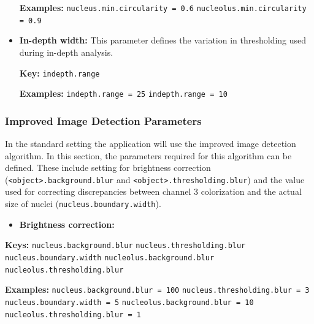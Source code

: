 \documentclass[a4paper, 12pt]{article}
\newcommand{\code}[1]{\colorbox{codegray}{\texttt{#1}}}
\begin{document}
\begin{itemize}
  \textbf{Examples:}
  \newline \code{nucleus.min.circularity = 0.6}
  \newline \code{nucleolus.min.circularity = 0.9}
  
  \item \textbf{In-depth width:} This parameter defines the variation in
  thresholding used during in-depth analysis.
  
  \textbf{Key:}
  \newline \code{indepth.range}
  
  \textbf{Examples:}
  \newline \code{indepth.range = 25}
  \newline \code{indepth.range = 10}
  
\end{itemize}

\subsubsection{Improved Image Detection Parameters}
In the standard setting the application will use the improved image detection
algorithm. In this section, the parameters required for this algorithm can be
defined. These include setting for brightness correction
(\code{<object>.background.blur} and \code{<object>.thresholding.blur}) and the
value used for correcting discrepancies between channel 3 colorization and the
actual size of nuclei (\code{nucleus.boundary.width}).

\begin{itemize}
  \item \textbf{Brightness correction:}
\end{itemize}

\textbf{Keys:}
\newline \code{nucleus.background.blur}
\newline \code{nucleus.thresholding.blur}
\newline \code{nucleus.boundary.width}
\newline \code{nucleolus.background.blur}
\newline \code{nucleolus.thresholding.blur}

\textbf{Examples:}
\newline \code{nucleus.background.blur = 100}
\newline \code{nucleus.thresholding.blur = 3}
\newline \code{nucleus.boundary.width = 5}
\newline \code{nucleolus.background.blur = 10}
\newline \code{nucleolus.thresholding.blur = 1}
\end{document}
